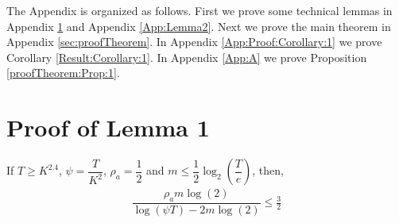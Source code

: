 
\appendix
The Appendix is organized as follows. First we prove some technical lemmas in Appendix \ref{App:Lemma1} and Appendix \ref{App:Lemma2}. Next we prove the main theorem in Appendix \ref{sec:proofTheorem}. In Appendix \ref{App:Proof:Corollary:1} we prove Corollary \ref{Result:Corollary:1}. In Appendix \ref{App:A} we prove Proposition \ref{proofTheorem:Prop:1}. 



\section{Proof of Lemma 1}
\label{App:Lemma1}

\begin{lemma}
\label{proofTheorem:Lemma:1}
If $T\geq K^{2.4}$, $\psi=\dfrac{T}{ K^2}$, $\rho_a =\dfrac{1}{2}$ and $m\leq \dfrac{1}{2} \log_2\left(\dfrac{T}{e}\right) $, then,
\begin{align*}
\dfrac{\rho_a m \log(2)}{\log(\psi T) - 2m\log( 2)} \leq \frac{3}{2}
\end{align*}
\end{lemma}

